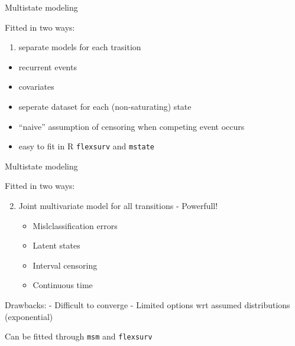 \documentclass[
  ignorenonframetext,
]{beamer}
\providecommand{\tightlist}{%
  \setlength{\itemsep}{0pt}\setlength{\parskip}{0pt}}
\begin{document}
\begin{frame}[fragile]{Multistate modeling}
\protect\hypertarget{multistate-modeling-2}{}

Fitted in two ways:

\begin{enumerate}
\tightlist
\item
  separate models for each trasition
\end{enumerate}

\begin{itemize}
\tightlist
\item
  recurrent events
\item
  covariates
\item
  seperate dataset for each (non-saturating) state
\item
  ``naive'' assumption of censoring when competing event occurs
\item
  easy to fit in R \texttt{flexsurv} and \texttt{mstate}
\end{itemize}

\end{frame}

\begin{frame}[fragile]{Multistate modeling}
\protect\hypertarget{multistate-modeling-3}{}

Fitted in two ways:

\begin{enumerate}
\setcounter{enumi}{1}
\tightlist
\item
  Joint multivariate model for all transitions - Powerfull!

  \begin{itemize}
  \tightlist
  \item
    Mislclassification errors
  \item
    Latent states
  \item
    Interval censoring
  \item
    Continuous time
  \end{itemize}
\end{enumerate}

Drawbacks: - Difficult to converge - Limited options wrt assumed
distributions (exponential)

Can be fitted through \texttt{msm} and \texttt{flexsurv}

\end{frame}
\end{document}
